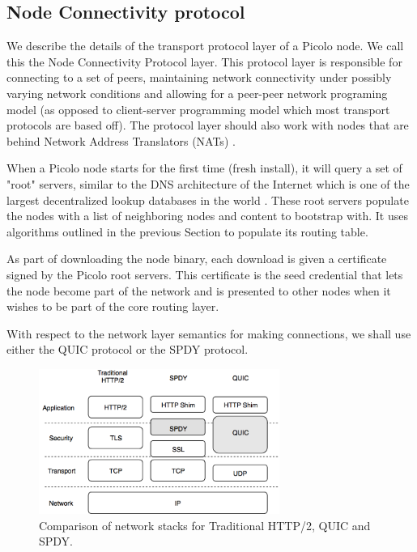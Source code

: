 \subsection{Node Connectivity protocol}
\label{net:net_proto}

We describe the details of the transport protocol layer of a Picolo node. We call this the Node Connectivity Protocol
layer. This protocol layer is responsible for connecting to a set of peers, maintaining network connectivity under
possibly varying network conditions and allowing for a peer-peer network programing model (as opposed to client-server
programming model which most transport protocols are based off).  The protocol layer should also work with nodes that
are behind Network Address Translators (NATs) \cite{nats}.

When a Picolo node starts for the first time (fresh install), it will query a set of "root" servers, similar to the DNS
architecture of the Internet which is one of the largest decentralized lookup databases in the world \cite{icann_root}. 
These root servers populate the nodes with a list of neighboring nodes and content to bootstrap with. It uses algorithms
outlined in the previous Section to populate its routing table.

As part of downloading the node binary, each download is given a certificate signed by the Picolo root servers. This
certificate is the seed credential that lets the node become part of the network and is presented to other nodes when it
wishes to be part of the core routing layer.

With respect to the network layer semantics for making connections, we shall use either the QUIC protocol or the SPDY
protocol.
\begin{figure}[h]
    \centering
    \includegraphics[width=0.7\textwidth]{fig/pic_netlayer.png}
  \caption{Comparison of network stacks for Traditional HTTP/2, QUIC and SPDY.}
\end{figure}

